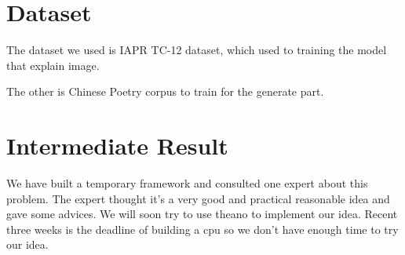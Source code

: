 \documentclass[10pt,twocolumn,letterpaper]{article}
\begin{document}
\section{Dataset}
The dataset we used is IAPR TC-12 dataset, which used to training the model that explain image. 

The other is Chinese Poetry corpus to train for the generate part.
\section{Intermediate Result}
We have built a temporary framework and consulted one expert about this problem. The expert thought it's a very good  and practical reasonable idea and gave some advices.
We will soon try to use theano to implement our idea. Recent three weeks is the deadline of building a cpu so we don't have enough time to try our idea.
\end{document}
